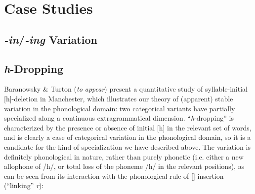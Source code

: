 



\section{Case Studies}
\label{cases}

\subsection{\textsl{-in}/\textsl{-ing} Variation}

\subsection{\textsl{h}-Dropping}

Baranowsky \& Turton (\textsl{to appear})  present a quantitative study of syllable-initial [h]-deletion in Manchester, which illustrates our theory of (apparent) stable variation in the phonological domain: two categorical variants have partially specialized along a continuous extragrammatical dimension.
``\textsl{h}-dropping'' is characterized by the presence or absence of initial [h] in the relevant set of words, and is clearly a case of categorical variation in the phonological domain, so it is a candidate for the kind of specialization we have described above.
The variation is definitely phonological in nature, rather than purely phonetic (i.e. either a new allophone of /h/, or total loss of the phoneme /h/ in the relevant positions), as can be seen from its interaction with the phonological rule of []-insertion (``linking'' \textsl{r}):




